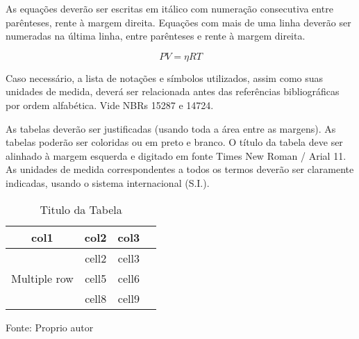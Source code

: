 \documentclass[../main.tex]{subfiles}
\begin{document}
  As equações deverão ser escritas em itálico com numeração consecutiva entre parênteses, rente à margem direita. Equações com mais de uma linha deverão ser numeradas na última linha, entre parênteses e rente à margem direita.

  \begin{equation}
    PV = \eta RT
  \end{equation}

  Caso necessário, a lista de notações e símbolos utilizados, assim como  suas unidades de medida, deverá ser relacionada antes das referências  bibliográficas por ordem alfabética. Vide NBRs 15287 e 14724.


  As tabelas deverão ser justificadas (usando toda a área entre as  margens).  As  tabelas  poderão  ser  coloridas  ou  em  preto  e  branco.  O  título  da  tabela  deve  ser  alinhado  à  margem  esquerda  e  digitado  em  fonte  Times  New  Roman  /  Arial  11.  As  unidades  de  medida  correspondentes  a  todos  os  termos  deverão ser claramente indicadas, usando o sistema internacional (S.I.). 

  \begin{table}
    \caption{Titulo da Tabela}
    \centering
    \begin{tabular}{ |c|c|c|c| } 
      \hline
      col1 & col2 & col3 \\
      \hline
      \multirow{3}{4em}{Multiple row} & cell2 & cell3 \\ 
      & cell5 & cell6 \\ 
      & cell8 & cell9 \\ 
      \hline
      \end{tabular}
    
      Fonte: Proprio autor
    \label{tab:table-name}
  \end{table}
\end{document}
